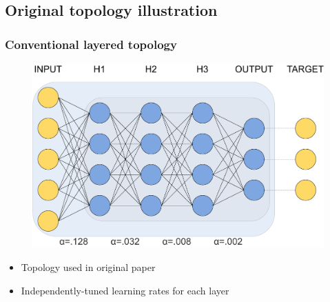 \documentclass[pdf]{beamer}
\begin{document}
\subsection{Original topology illustration}
\begin{frame}
	\frametitle{Conventional layered topology}
	\begin{figure}
		\includegraphics[width=.8\textwidth]{figures/basic_topology_illustration.pdf}
	\end{figure}
	\begin{itemize}
		\item Topology used in original paper
		\item Independently-tuned learning rates for each layer
	\end{itemize}
\end{frame}
\end{document}
